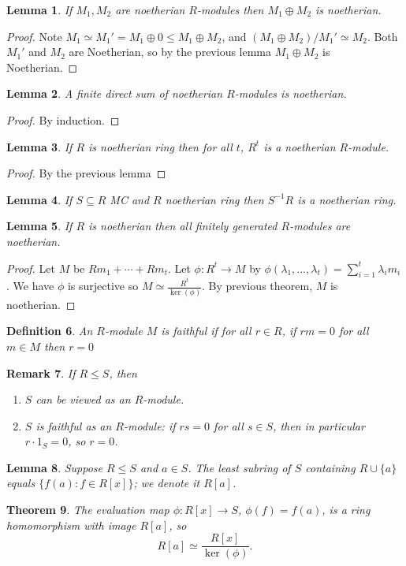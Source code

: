 \documentclass[a4paper,12pt]{article}
\newtheorem{thm}{Theorem}[section]
\newtheorem{lem}[thm]{Lemma}
\newtheorem{defn}[thm]{Definition}
\newtheorem{rmk}[thm]{Remark}
\begin{document}
\begin{lem}
    If $M_1,M_2$ are noetherian $R$-modules then $M_1\oplus M_2$ is noetherian. 
\end{lem}
\begin{proof}
    Note $M_1\simeq M_1'=M_1\oplus 0\leq M_1\oplus M_2$, and $(M_1\oplus M_2)/M_1'\simeq M_2$. Both $M_1'$ and $M_2$ are Noetherian, so by the previous lemma $M_1\oplus M_2$ is Noetherian.
\end{proof}
\begin{lem}
    A finite direct sum of noetherian $R$-modules is noetherian. 
\end{lem}
\begin{proof}
    By induction.
\end{proof}
\begin{lem}
    If $R$ is noetherian ring then for all $t$, $R^t$ is a noetherian $R$-module. 
\end{lem}
\begin{proof}
    By the previous lemma
\end{proof}
\begin{lem}
    If $S\subseteq R$ MC and $R$ noetherian ring then $S^{-1}R$ is a noetherian ring. 
\end{lem}
\begin{lem}
    If $R$ is noetherian then all finitely generated $R$-modules are noetherian. 
\end{lem}
\begin{proof}
    Let $M$ be $Rm_1+\cdots+Rm_t$. Let $\phi:R^t\to M$ by $\phi(\lambda_1,...,\lambda_t)=\sum_{i=1}^t \lambda_i m_i$. We have $\phi$ is surjective so $M\simeq \frac{R^t}{\ker(\phi)}$. By previous theorem, $M$ is noetherian. 
\end{proof}
\begin{defn}
    An $R$-module $M$ is faithful if for all $r\in R$, if $rm=0$ for all $m\in M$ then $r=0$
\end{defn}
\begin{rmk}
    If $R\leq S$, then
    \begin{enumerate}
        \item $S$ can be viewed as an $R$-module.
        \item $S$ is faithful as an $R$-module: if $rs=0$ for all $s\in S$, then in particular $r\cdot 1_S=0$, so $r=0$.
    \end{enumerate}
\end{rmk}
\begin{lem}
    Suppose $R\leq S$ and $a\in S$. The least subring of $S$ containing $R\cup \{a\}$ equals $\{f(a): f\in R[x]\}$; we denote it $R[a]$.
\end{lem}
\begin{thm}
    The evaluation map $\phi:R[x]\to S$, $\phi(f)=f(a)$, is a ring homomorphism with image $R[a]$, so
    \[
    R[a]\simeq \frac{R[x]}{\ker(\phi)}.
    \]
\end{thm}
\end{document}
